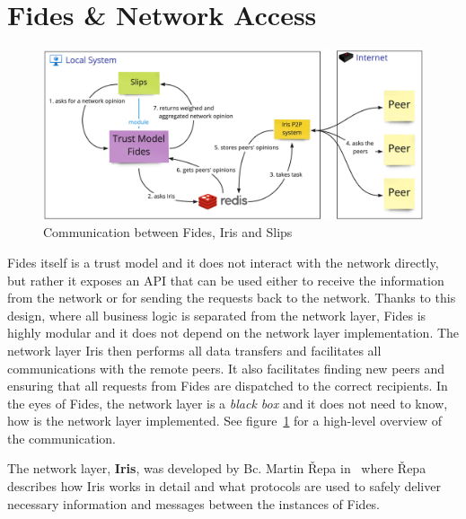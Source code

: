 \section{Fides \& Network Access}
\label{sec:fides-and-network-access}

\begin{figure}[ht]
    \centering
    \includegraphics[width=1.0\textwidth]{assets/communication_architecture.jpeg}
    \caption{Communication between Fides, Iris and Slips}
    \label{fig:fides-api-network}
\end{figure}

Fides itself is a trust model and it does not interact with the network directly, but rather it exposes an API that can be used either to receive the information from the network or for sending the requests back to the network.
Thanks to this design, where all business logic is separated from the network layer, Fides is highly modular and it does not depend on the network layer implementation.
The network layer Iris then performs all data transfers and facilitates all communications with the remote peers.
It also facilitates finding new peers and ensuring that all requests from Fides are dispatched to the correct recipients.
In the eyes of Fides, the network layer is a \textit{black box} and it does not need to know, how is the network layer implemented.
See figure~\ref{fig:fides-api-network} for a high-level overview of the communication.

The network layer, \textbf{Iris}, was developed by Bc. Martin Řepa in~\cite{nl} where Řepa describes how Iris works in detail and what protocols are used to safely deliver necessary information and messages between the instances of Fides.